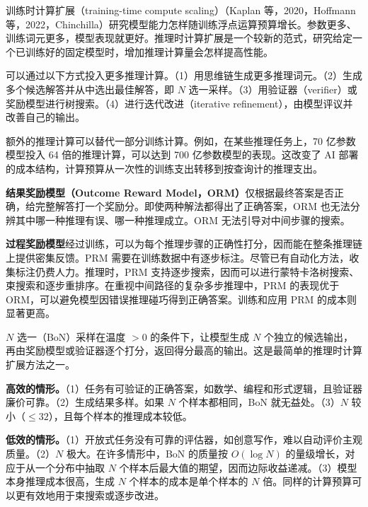 \begin{interview}
训练时计算扩展（training-time compute scaling）（Kaplan 等，2020，Hoffmann 等，2022，Chinchilla）研究模型能力怎样随训练浮点运算预算增长。参数更多、训练词元更多，模型表现就更好。推理时计算扩展是一个较新的范式，研究给定一个已训练好的固定模型时，增加推理计算量会怎样提高性能。

可以通过以下方式投入更多推理计算。（1）用思维链生成更多推理词元。（2）生成多个候选解答并从中选出最佳解答，即 \(N\) 选一采样。（3）用验证器（verifier）或奖励模型进行树搜索。（4）进行迭代改进（iterative refinement），由模型评议并改善自己的输出。

额外的推理计算可以替代一部分训练计算。例如，在某些推理任务上，70 亿参数模型投入 64 倍的推理计算，可以达到 700 亿参数模型的表现。这改变了 AI 部署的成本结构，计算预算从一次性的训练支出转移到按查询计的推理支出。

\textbf{结果奖励模型（Outcome Reward Model，ORM）}仅根据最终答案是否正确，给完整解答打一个奖励分。即使两种解法都得出了正确答案，ORM 也无法分辨其中哪一种推理有误、哪一种推理成立。ORM 无法引导对中间步骤的搜索。

\textbf{过程奖励模型}经过训练，可以为每个推理步骤的正确性打分，因而能在整条推理链上提供密集反馈。PRM 需要在训练数据中有逐步标注。尽管已有自动化方法，收集标注仍费人力。推理时，PRM 支持逐步搜索，因而可以进行蒙特卡洛树搜索、束搜索和逐步重排序。在重视中间路径的复杂多步推理中，PRM 的表现优于 ORM，可以避免模型因错误推理碰巧得到正确答案。训练和应用 PRM 的成本则显著更高。

\(N\) 选一（BoN）采样在温度 \(>0\) 的条件下，让模型生成 \(N\) 个独立的候选输出，再由奖励模型或验证器逐个打分，返回得分最高的输出。这是最简单的推理时计算扩展方法之一。

\textbf{高效的情形。}（1）任务有可验证的正确答案，如数学、编程和形式逻辑，且验证器廉价可靠。（2）生成结果多样。如果 \(N\) 个样本都相同，BoN 就无益处。（3）\(N\) 较小（\(\le 32\)），且每个样本的推理成本较低。

\textbf{低效的情形。}（1）开放式任务没有可靠的评估器，如创意写作，难以自动评价主观质量。（2）\(N\) 极大。在许多情形中，BoN 的质量按 \(O(\log N)\) 的量级增长，对应于从一个分布中抽取 \(N\) 个样本后最大值的期望，因而边际收益递减。（3）模型本身推理成本很高，生成 \(N\) 个样本的成本是单个样本的 \(N\) 倍。同样的计算预算可以更有效地用于束搜索或逐步改进。


\end{interview}
